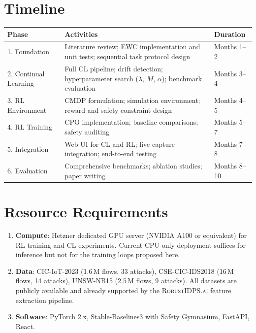 \documentclass[12pt,a4paper]{article}
\newcommand{\RobustIDPS}{\textsc{RobustIDPS.ai}}
\theoremstyle{definition}
\begin{document}
\section{Timeline}
\label{sec:timeline}

\begin{center}
\begin{tabularx}{\textwidth}{lXl}
\toprule
Phase & Activities & Duration \\
\midrule
1. Foundation & Literature review; EWC implementation and unit tests; sequential task protocol design & Months 1--2 \\
2. Continual Learning & Full CL pipeline; drift detection; hyperparameter search ($\lambda$, $M$, $\alpha$); benchmark evaluation & Months 3--4 \\
3. RL Environment & CMDP formulation; simulation environment; reward and safety constraint design & Months 4--5 \\
4. RL Training & CPO implementation; baseline comparisons; safety auditing & Months 5--7 \\
5. Integration & Web UI for CL and RL; live capture integration; end-to-end testing & Months 7--8 \\
6. Evaluation & Comprehensive benchmarks; ablation studies; paper writing & Months 8--10 \\
\bottomrule
\end{tabularx}
\end{center}


\section{Resource Requirements}
\label{sec:resources}

\begin{enumerate}
\item \textbf{Compute}: Hetzner dedicated GPU server (NVIDIA A100 or equivalent) for RL training and CL experiments.
  Current CPU-only deployment suffices for inference but not for the training loops proposed here.
\item \textbf{Data}: CIC-IoT-2023 (1.6\,M flows, 33 attacks), CSE-CIC-IDS2018 (16\,M flows, 14 attacks), UNSW-NB15 (2.5\,M flows, 9 attacks).
  All datasets are publicly available and already supported by the \RobustIDPS{} feature extraction pipeline.
\item \textbf{Software}: PyTorch 2.x, Stable-Baselines3 with Safety Gymnasium, FastAPI, React.
\end{enumerate}
\end{document}
